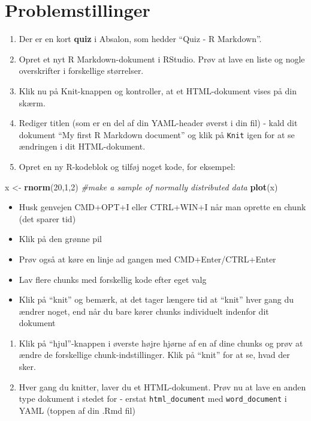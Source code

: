 \documentclass[
]{book}
\newenvironment{Shaded}{\begin{snugshade}}{\end{snugshade}}
\newcommand{\CommentTok}[1]{\textcolor[rgb]{0.56,0.35,0.01}{\textit{#1}}}
\newcommand{\DecValTok}[1]{\textcolor[rgb]{0.00,0.00,0.81}{#1}}
\newcommand{\FunctionTok}[1]{\textcolor[rgb]{0.13,0.29,0.53}{\textbf{#1}}}
\newcommand{\NormalTok}[1]{#1}
\newcommand{\OtherTok}[1]{\textcolor[rgb]{0.56,0.35,0.01}{#1}}
\providecommand{\tightlist}{%
  \setlength{\itemsep}{0pt}\setlength{\parskip}{0pt}}
\begin{document}
\section{Problemstillinger}\label{problemstillinger-1}

\begin{enumerate}
\def\labelenumi{\arabic{enumi})}
\item
  Der er en kort \textbf{quiz} i Absalon, som hedder ``Quiz - R Markdown''.
\item
  Opret et nyt R Markdown-dokument i RStudio. Prøv at lave en liste og nogle overskrifter i forskellige størrelser.
\item
  Klik nu på Knit-knappen og kontroller, at et HTML-dokument vises på din skærm.
\item
  Rediger titlen (som er en del af din YAML-header øverst i din fil) - kald dit dokument ``My first R Markdown document'' og klik på \texttt{Knit} igen for at se ændringen i dit HTML-dokument.
\item
  Opret en ny R-kodeblok og tilføj noget kode, for eksempel:
\end{enumerate}

\begin{Shaded}
\begin{Highlighting}[]
\NormalTok{x }\OtherTok{\textless{}{-}} \FunctionTok{rnorm}\NormalTok{(}\DecValTok{20}\NormalTok{,}\DecValTok{1}\NormalTok{,}\DecValTok{2}\NormalTok{) }\CommentTok{\#make a sample of normally distributed data}
\FunctionTok{plot}\NormalTok{(x)}
\end{Highlighting}
\end{Shaded}

\begin{itemize}
\tightlist
\item
  Husk genvejen CMD+OPT+I eller CTRL+WIN+I når man oprette en chunk (det sparer tid)
\item
  Klik på den grønne pil
\item
  Prøv også at køre en linje ad gangen med CMD+Enter/CTRL+Enter
\item
  Lav flere chunks med forskellig kode efter eget valg
\item
  Klik på ``knit'' og bemærk, at det tager længere tid at ``knit'' hver gang du ændrer noget, end når du bare kører chunks individuelt indenfor dit dokument
\end{itemize}

\begin{enumerate}
\def\labelenumi{\arabic{enumi})}
\setcounter{enumi}{5}
\item
  Klik på ``hjul''-knappen i øverste højre hjørne af en af dine chunks og prøv at ændre de forskellige chunk-indstillinger. Klik på ``knit'' for at se, hvad der sker.
\item
  Hver gang du knitter, laver du et HTML-dokument. Prøv nu at lave en anden type dokument i stedet for - erstat \texttt{html\_document} med \texttt{word\_document} i YAML (toppen af din .Rmd fil)
\end{enumerate}
\end{document}
